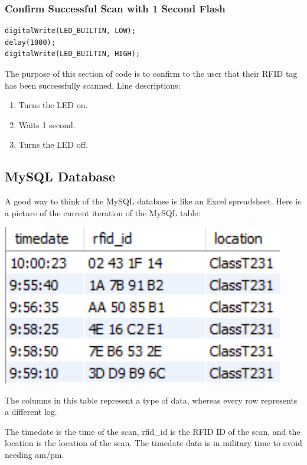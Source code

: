 \documentclass[12pt]{article}
\begin{document}
\begin{spacing}{1.2}
\subsubsection{Confirm Successful Scan with 1 Second Flash}

\begin{lstlisting}[language=Arduino]  
digitalWrite(LED_BUILTIN, LOW);   
delay(1000);              
digitalWrite(LED_BUILTIN, HIGH);  
\end{lstlisting}
The purpose of this section of code is to confirm to the user that their RFID tag has been successfully scanned.
\newline\newline
Line descriptions:
\begin{enumerate}
	\item Turns the LED on.
	\item Waits 1 second.
	\item Turns the LED off.
\end{enumerate}

\subsection{MySQL Database}

A good way to think of the MySQL database is like an Excel spreadsheet. Here is a picture of the current iteration of the MySQL table:
\begin{center}
\includegraphics[height=7cm]{MySQL Table.png}
\end{center}
The columns in this table represent a type of data, whereas every row represents a different log.

The timedate is the time of the scan, rfid\_id is the RFID ID of the scan, and the location is the location of the scan. The timedate data is in military time to avoid needing am/pm.


\end{spacing}
\end{document}
